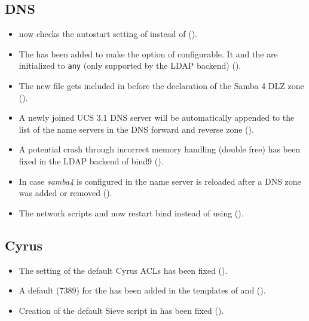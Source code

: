 \subsection{DNS}
\begin{itemize}
\item {} now checks the autostart setting of
   instead of 
  ().
\item The  has been added to make the
   option of  configurable. It
  and the  are initialized to \texttt{any}
  (only supported by the LDAP backend) ().
\item The new file  gets included in
   before the declaration of the Samba 4
  DLZ zone ().
\item A newly joined UCS 3.1 DNS server will be automatically appended
  to the list of the name servers in the DNS forward and reverse zone
  ().
\item A potential crash through incorrect memory handling (double
  free) has been fixed in the LDAP backend of bind9 ().
\item In case \emph{samba4} is configured in 
  the name server is reloaded after a DNS zone was added or removed
  ().
\item The network scripts  and  now
  restart bind instead of using 
  ().
\end{itemize}

\subsection{Cyrus}
\begin{itemize}
\item The setting of the default Cyrus ACLs has been fixed ().

\item A default (7389) for the  has been added
in the \ucsUCR{} templates of  and
 ().

\item Creation of the default Sieve script in
   has been fixed ().
\end{itemize}

